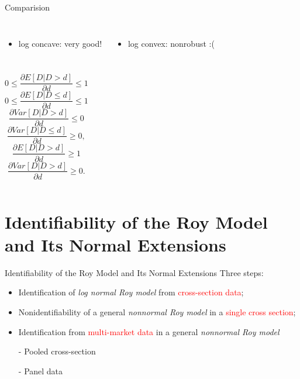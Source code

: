 \documentclass{beamer}
\begin{document}
\begin{frame}{Comparision}
	\begin{columns}
		\begin{itemize}
			\item log concave: very good!
		\end{itemize}
		\begin{itemize}
			\item log convex: nonrobust :(
		\end{itemize}
	\end{columns}
	\medskip

	\begin{columns}
		\column{0.5\textwidth}
			$$0\leq \frac{\partial E[D|D>d]}{\partial d}\leq 1 $$
			$$0\leq \frac{\partial E[D|D\leq d]}{\partial d}\leq 1 $$
			\medskip
			$$\frac{\partial Var[D|D>d]}{\partial d}\leq 0 $$
			$$\frac{\partial Var[D|D\leq d]}{\partial d}\geq 0, $$
		\column{0.5\textwidth}
			$$\frac{\partial E[D|D>d]}{\partial d}\geq 1$$
			\bigskip
			$$\frac{\partial Var[D|D>d]}{\partial d}\geq 0. $$
	\end{columns}	
\end{frame}


\section{Identifiability of the Roy Model and Its Normal Extensions} 
\begin{frame}{Identifiability of the Roy Model and Its Normal Extensions}
Three steps:
	\begin{itemize}
		\item Identification of \textit{log normal Roy model} from \textcolor{red}{cross-section data};
		\item Nonidentifiability of a general \textit{nonnormal Roy model} in a \textcolor{red}{single cross section};
		\item Identification from \textcolor{red}{multi-market data} in a general \textit{nonnormal Roy model}
		\item [-] Pooled cross-section
		\item [-] Panel data
	\end{itemize}
\end{frame}


\end{document}
